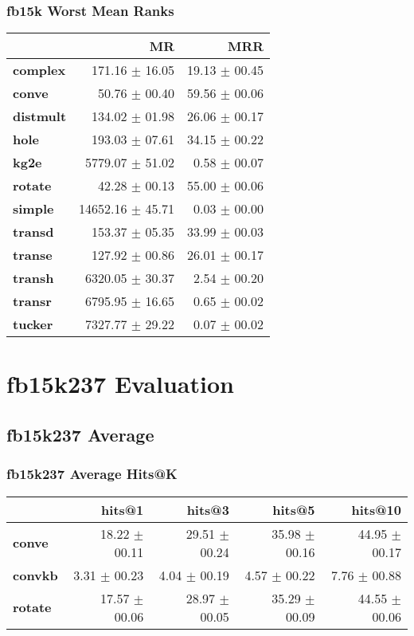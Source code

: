 \documentclass{article}
\begin{document}
\subsubsection{fb15k Worst Mean Ranks}
    \begin{center}
    \begin{tabular}{lrr}
\toprule
{} &                MR &            MRR \\
\midrule
\textbf{complex } &    171.16 $\pm$ 16.05 &  19.13 $\pm$ 00.45 \\
\textbf{conve   } &     50.76 $\pm$ 00.40 &  59.56 $\pm$ 00.06 \\
\textbf{distmult} &    134.02 $\pm$ 01.98 &  26.06 $\pm$ 00.17 \\
\textbf{hole    } &    193.03 $\pm$ 07.61 &  34.15 $\pm$ 00.22 \\
\textbf{kg2e    } &   5779.07 $\pm$ 51.02 &   0.58 $\pm$ 00.07 \\
\textbf{rotate  } &     42.28 $\pm$ 00.13 &  55.00 $\pm$ 00.06 \\
\textbf{simple  } &  14652.16 $\pm$ 45.71 &   0.03 $\pm$ 00.00 \\
\textbf{transd  } &    153.37 $\pm$ 05.35 &  33.99 $\pm$ 00.03 \\
\textbf{transe  } &    127.92 $\pm$ 00.86 &  26.01 $\pm$ 00.17 \\
\textbf{transh  } &   6320.05 $\pm$ 30.37 &   2.54 $\pm$ 00.20 \\
\textbf{transr  } &   6795.95 $\pm$ 16.65 &   0.65 $\pm$ 00.02 \\
\textbf{tucker  } &   7327.77 $\pm$ 29.22 &   0.07 $\pm$ 00.02 \\
\bottomrule
\end{tabular}

    \end{center}

\section{fb15k237 Evaluation}
\subsection{fb15k237 Average}
\subsubsection{fb15k237 Average Hits@K}
    \begin{center}
    \begin{tabular}{lrrrr}
\toprule
{} &         hits@1 &         hits@3 &         hits@5 &        hits@10 \\
\midrule
\textbf{conve } &  18.22 $\pm$ 00.11 &  29.51 $\pm$ 00.24 &  35.98 $\pm$ 00.16 &  44.95 $\pm$ 00.17 \\
\textbf{convkb} &   3.31 $\pm$ 00.23 &   4.04 $\pm$ 00.19 &   4.57 $\pm$ 00.22 &   7.76 $\pm$ 00.88 \\
\textbf{rotate} &  17.57 $\pm$ 00.06 &  28.97 $\pm$ 00.05 &  35.29 $\pm$ 00.09 &  44.55 $\pm$ 00.06 \\
\bottomrule
\end{tabular}

    \end{center}
\end{document}
